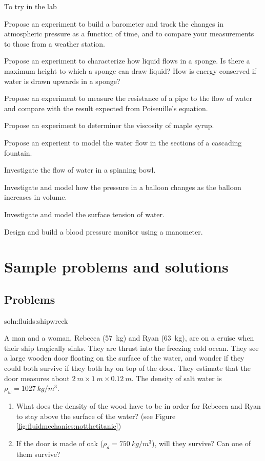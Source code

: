 {{\begin{chapteractivity}{To try in the lab}
{
\item Propose an experiment to build a barometer and track the changes in atmospheric pressure as a function of time, and to compare your measurements to those from a weather station. 
\item Propose an experiment to characterize how liquid flows in a sponge. Is there a maximum height to which a sponge can draw liquid? How is energy conserved if water is drawn upwards in a sponge?
\item Propose an experiment to measure the resistance of a pipe to the flow of water and compare with the result expected from Poiseuille's equation.
\item Propose an experiment to determiner the viscosity of maple syrup.
\item Propose an experient to model the water flow in the sections of a cascading fountain.
\item Investigate the flow of water in a spinning bowl.
\item Investigate and model how the pressure in a balloon changes as the balloon increases in volume.
\item Investigate and model the surface tension of water.
\item Design and build a blood pressure monitor using a manometer.
}
\end{chapteractivity}

\newpage
\section{Sample problems and solutions}
\subsection{Problems}
\begin{problem}{soln:fluids:shipwreck}{\label{prob:fluids:shipwreck}A man and a woman, Rebecca (\SI{57}{kg}) and Ryan (\SI{63}{kg}), are on a cruise when their ship tragically sinks. They are thrust into the freezing cold ocean. They see a large wooden door floating on the surface of the water, and wonder if they could both survive if they both lay on top of the door. They estimate that the door measures about $\SI{2}{m}\times\SI{1}{m}\times\SI{0.12}{m}$. The density of salt water is $\rho_w=\SI{1027}{kg/m^3}$.
\begin{enumerate}[label=\alph*),topsep=-10pt]
\item What does the density of the wood have to be in order for Rebecca and Ryan to stay above the surface of the water? (see Figure \ref{fig:fluidmechanics:notthetitanic}) 
\item If the door is made of oak ($\rho_d=\SI{750}{kg/m^3}$), will they survive? Can one of them survive?
\end{enumerate}
}
\end{problem}

}}
